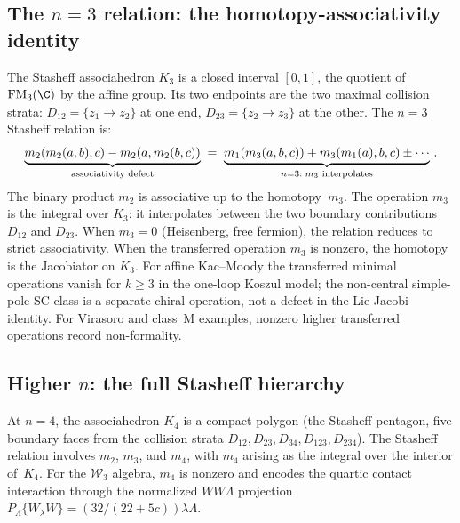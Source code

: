 \subsection*{The $n = 3$ relation: the homotopy-associativity
identity}

The Stasheff associahedron $K_3$ is a closed interval $[0,1]$,
the quotient of $\FM_3(\C)$ by the affine group.
Its two endpoints are the two maximal collision strata:
$D_{12}=\{z_1\to z_2\}$ at one end,
$D_{23}=\{z_2\to z_3\}$ at the other.
The $n=3$ Stasheff relation is:
\[
\underbrace{m_2(m_2(a,b),c) - m_2(a,m_2(b,c))}_{%
 \text{associativity defect}}
\;=\;
\underbrace{m_1(m_3(a,b,c)) + m_3(m_1(a),b,c)
\pm\cdots}_{n=3:\;m_3\text{~interpolates}}\,.
\]
The binary product $m_2$ is associative up to the homotopy~$m_3$.
The operation $m_3$ is the integral over $K_3$:
it interpolates between the two boundary contributions
$D_{12}$ and $D_{23}$. When $m_3=0$ (Heisenberg, free
fermion), the relation reduces to strict associativity.
When the transferred operation $m_3$ is nonzero, the homotopy is the
Jacobiator on $K_3$.  For affine Kac--Moody the transferred minimal
operations vanish for $k \ge 3$ in the one-loop Koszul model; the
non-central simple-pole SC class is a separate chiral operation, not a
defect in the Lie Jacobi identity.  For Virasoro and class~M examples,
nonzero higher transferred operations record non-formality.

\subsection*{Higher $n$: the full Stasheff hierarchy}

At $n=4$, the associahedron $K_4$ is a compact polygon
(the Stasheff pentagon, five boundary faces from the
collision strata $D_{12}, D_{23}, D_{34}, D_{123}, D_{234}$).
The Stasheff relation involves $m_2$, $m_3$, and $m_4$,
	with $m_4$ arising as the integral over the interior of~$K_4$. For the
	$\mathcal{W}_3$ algebra, $m_4$ is nonzero and encodes the quartic
	contact interaction through the normalized $WW\Lambda$ projection
	\(P_\Lambda\{W_\lambda W\}=(32/(22+5c))\lambda\Lambda\).


